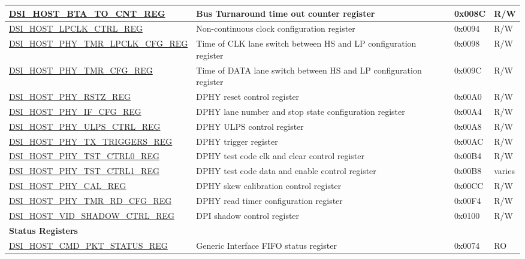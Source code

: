 \begin{longtable}{ | p{6.8cm} | p{7.2cm} | p{1.3cm} | p{1cm} | }
\hyperref[regdesc:DSIHOSTBTATOCNTREG]{DSI\_HOST\_BTA\_TO\_CNT\_REG} & Bus Turnaround time out counter register & 0x008C & R/W \\ \hline
\hyperref[regdesc:DSIHOSTLPCLKCTRLREG]{DSI\_HOST\_LPCLK\_CTRL\_REG} & Non-continuous clock configuration register & 0x0094 & R/W \\ \hline
\hyperref[regdesc:DSIHOSTPHYTMRLPCLKCFGREG]{DSI\_HOST\_PHY\_TMR\_LPCLK\_CFG\_REG} & Time of CLK lane switch between HS and LP configuration register & 0x0098 & R/W \\ \hline
\hyperref[regdesc:DSIHOSTPHYTMRCFGREG]{DSI\_HOST\_PHY\_TMR\_CFG\_REG} & Time of DATA lane switch between HS and LP configuration register & 0x009C & R/W \\ \hline
\hyperref[regdesc:DSIHOSTPHYRSTZREG]{DSI\_HOST\_PHY\_RSTZ\_REG} & DPHY reset control register & 0x00A0 & R/W \\ \hline
\hyperref[regdesc:DSIHOSTPHYIFCFGREG]{DSI\_HOST\_PHY\_IF\_CFG\_REG} & DPHY lane number and stop state configuration register & 0x00A4 & R/W \\ \hline
\hyperref[regdesc:DSIHOSTPHYULPSCTRLREG]{DSI\_HOST\_PHY\_ULPS\_CTRL\_REG} & DPHY ULPS control register & 0x00A8 & R/W \\ \hline
\hyperref[regdesc:DSIHOSTPHYTXTRIGGERSREG]{DSI\_HOST\_PHY\_TX\_TRIGGERS\_REG} & DPHY trigger register & 0x00AC & R/W \\ \hline
\hyperref[regdesc:DSIHOSTPHYTSTCTRL0REG]{DSI\_HOST\_PHY\_TST\_CTRL0\_REG} & DPHY test code clk and clear control register & 0x00B4 & R/W \\ \hline
\hyperref[regdesc:DSIHOSTPHYTSTCTRL1REG]{DSI\_HOST\_PHY\_TST\_CTRL1\_REG} & DPHY test code data and enable control register & 0x00B8 & varies \\ \hline
\hyperref[regdesc:DSIHOSTPHYCALREG]{DSI\_HOST\_PHY\_CAL\_REG} & DPHY skew calibration control register & 0x00CC & R/W \\ \hline
\hyperref[regdesc:DSIHOSTPHYTMRRDCFGREG]{DSI\_HOST\_PHY\_TMR\_RD\_CFG\_REG} & DPHY read timer configuration register & 0x00F4 & R/W \\ \hline
\hyperref[regdesc:DSIHOSTVIDSHADOWCTRLREG]{DSI\_HOST\_VID\_SHADOW\_CTRL\_REG} & DPI shadow control register & 0x0100 & R/W \\ \hline
\multicolumn{4}{|l|}{\textbf{Status Registers}} \\ \hline
\hyperref[regdesc:DSIHOSTCMDPKTSTATUSREG]{DSI\_HOST\_CMD\_PKT\_STATUS\_REG} & Generic Interface FIFO status register & 0x0074 & RO \\ \hline

\end{longtable}
